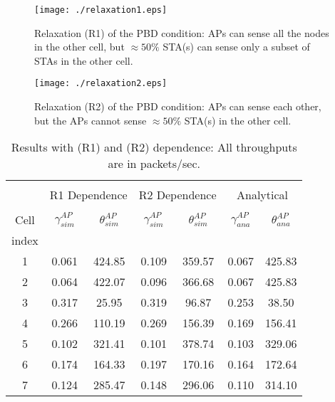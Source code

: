 \documentclass[10pt,a4paper,journal]{IEEEtran}
\theoremstyle{definition}
\theoremstyle{remark}
\theoremstyle{plain}
\begin{document}
\begin{figure}[tb]
\centering
\hspace{-4mm}
\begin{minipage}{4.5cm}
\begin{center}
\texttt{[image: ./relaxation1.eps]}
\caption{Relaxation (R1) of the PBD condition: APs can sense all the
  nodes in the other cell, but $\approx 50\%$ STA(s) can sense only a
  subset of STAs in the other cell. \label{fig:relaxation1}}
\end{center}
\end{minipage}
\hspace{1mm}
\begin{minipage}{3.2cm}
\begin{center}
\texttt{[image: ./relaxation2.eps]}
\caption{Relaxation (R2) of the PBD condition: APs can sense each
  other, but the APs cannot sense $\approx 50\%$ STA(s) in the other
  cell. \label{fig:relaxation2}}
\end{center}
\end{minipage}
\end{figure}


\begin{small}
\begin{table}[tb]
\begin{center}
\caption{\label{table:results-when-PBD-does-not-hold} Results with (R1) and (R2) dependence: All throughputs are in packets/sec.}
\begin{footnotesize}
\begin{tabular}{||c|c|c|c|c|c|c||}
\hline
& \multicolumn{2}{c|}{} & \multicolumn{2}{c|}{} & \multicolumn{2}{c||}{} \\
& \multicolumn{2}{c|}{R1 Dependence} & \multicolumn{2}{c|}{R2 Dependence} & \multicolumn{2}{c||}{Analytical} \\
\cline{2-7} & & & & & & \\
Cell & $\gamma_{sim}^{AP}$ & $\theta_{sim}^{AP}$ & $\gamma_{sim}^{AP}$ & $\theta_{sim}^{AP}$ & $\gamma_{ana}^{AP}$ & $\theta_{ana}^{AP}$ \\
index & & & & & & \\
\hline
\hline
1 & 0.061 & 424.85 & 0.109 & 359.57 & 0.067 & 425.83 \\
\hline
2 & 0.064 & 422.07 & 0.096 & 366.68 & 0.067 & 425.83 \\
\hline
3 & 0.317 & 25.95 & 0.319 & 96.87 & 0.253 & 38.50 \\
\hline
4 & 0.266 & 110.19 & 0.269 & 156.39 & 0.169 & 156.41 \\
\hline
5 & 0.102 & 321.41 & 0.101 & 378.74 & 0.103 & 329.06 \\
\hline
6 & 0.174 & 164.33 & 0.197 & 170.16 & 0.164 & 172.64 \\
\hline
7 & 0.124 & 285.47 & 0.148 & 296.06 & 0.110 & 314.10 \\
\hline
\end{tabular}
\end{footnotesize}
\end{center}
\end{table}
\end{small}
\end{document}
